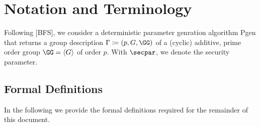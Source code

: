 \documentclass[runningheads]{llncs}
\begin{document}
\section{Notation and Terminology}

Following [BFS], we consider a deterministic parameter genration algorithm Pgen that returns a group description $\Gamma \defeq (p, G, \GG)$ of a (cyclic) additive, prime order group $\GG = \langle G \rangle$ of order $p$. With $\secpar$, we denote the security parameter.

\subsection{Formal Definitions}
  In the following we provide the formal definitions required for the remainder of this document.

\end{document}
